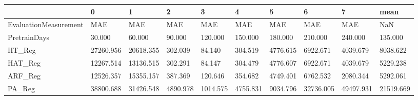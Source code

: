 \begin{tabular}{llllllllll}
\toprule
{} &         0 &         1 &        2 &        3 &        4 &        5 &         6 &         7 &      mean \\
\midrule
EvaluationMeasurement &       MAE &       MAE &      MAE &      MAE &      MAE &      MAE &       MAE &       MAE &       NaN \\
PretrainDays          &    30.000 &    60.000 &   90.000 &  120.000 &  150.000 &  180.000 &   210.000 &   240.000 &   135.000 \\
HT\_Reg                & 27260.956 & 20618.355 &  302.039 &   84.140 &  304.519 & 4776.615 &  6922.671 &  4039.679 &  8038.622 \\
HAT\_Reg               & 12267.514 & 13136.515 &  302.291 &   84.147 &  304.479 & 4776.607 &  6922.671 &  4039.679 &  5229.238 \\
ARF\_Reg               & 12526.357 & 15355.157 &  387.369 &  120.646 &  354.682 & 4749.401 &  6762.532 &  2080.344 &  5292.061 \\
PA\_Reg                & 38800.688 & 31426.548 & 4890.978 & 1014.575 & 4755.831 & 9034.796 & 32736.005 & 49497.931 & 21519.669 \\
\bottomrule
\end{tabular}
